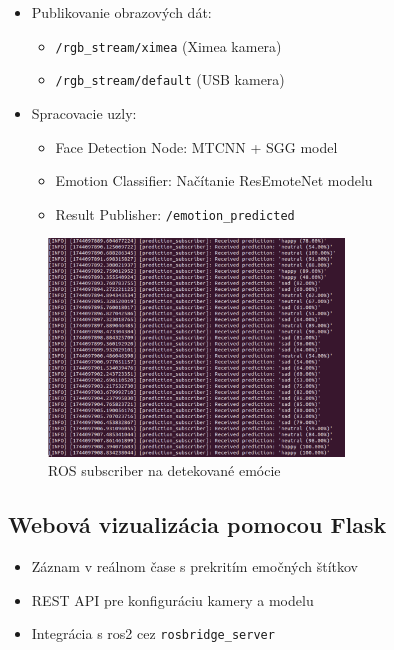 \begin{itemize}
\item Publikovanie obrazových dát:
  \begin{itemize}
  \item \texttt{/rgb\_stream/ximea} (Ximea kamera)
  \item \texttt{/rgb\_stream/default} (USB kamera)
  \end{itemize}
\item Spracovacie uzly:
  \begin{itemize}
  \item Face Detection Node: MTCNN + SGG model
  \item Emotion Classifier: Načítanie ResEmoteNet modelu
  \item Result Publisher: \texttt{/emotion\_predicted}
  \end{itemize}
\end{itemize}
\begin{figure}[!htpb]
    \centering
    \includegraphics[width=0.7\textwidth]{img/subscriber.png}
    \caption{ROS subscriber na detekované emócie}
    \label{fig:ros2_terminal}
\end{figure}
\newpage
\subsection{Webová vizualizácia pomocou Flask}
\begin{itemize}
\item Záznam v reálnom čase s prekritím emočných štítkov
\item REST API pre konfiguráciu kamery a modelu
\item Integrácia s \gls{ros}2 cez \texttt{rosbridge\_server}
\end{itemize}

